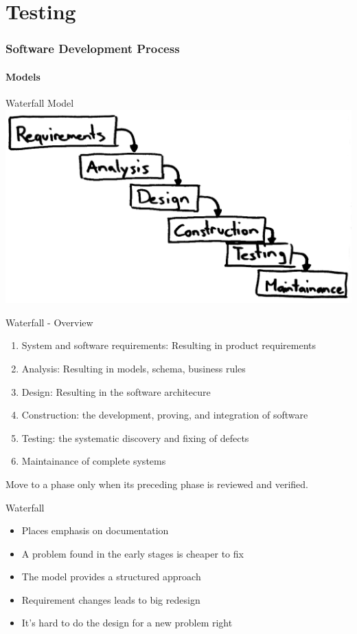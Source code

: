 \documentclass{beamer}
\begin{document}
\part{Testing}

\section{Software Development Process}

\subsection{Models}

\begin{frame}{Waterfall Model}
\includegraphics[scale=0.3]{img/Waterfall.png}
\end{frame}

\begin{frame}{Waterfall - Overview}
\begin{enumerate}
  \item System and software requirements: Resulting in product requirements
  \item Analysis: Resulting in models, schema, business rules
  \item Design: Resulting in  the software architecure
  \item Construction: the development, proving, and integration of software
  \item Testing: the systematic discovery and fixing of defects
  \item Maintainance of complete systems
\end{enumerate}
Move to a phase only when its preceding phase is reviewed and verified.
\end{frame}

\begin{frame}{Waterfall}
\begin{itemize}
  \item Places emphasis on documentation
  \item A problem found in the early stages is cheaper to fix
  \item The model provides a structured approach
  \item Requirement changes leads to big redesign
  \item It's hard to do the design for a new problem right
\end{itemize}
\end{frame}
\end{document}
